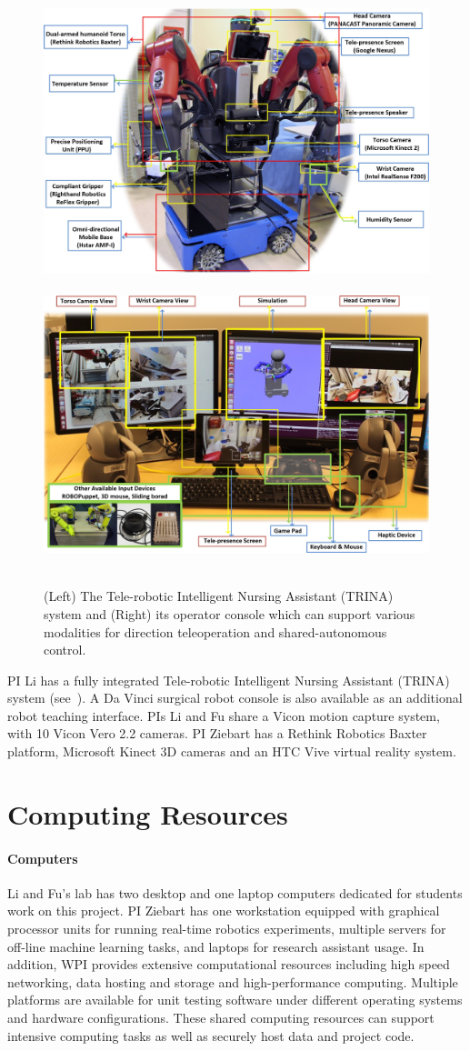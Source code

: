 \begin{figure}[h!]
\mbox{
  \includegraphics[width=0.48\linewidth]{fig//TRINA_Hardware_Notes}
    \includegraphics[width=0.48\linewidth]{fig//TRINA_Console_Notes}
}
    \caption{(Left) The Tele-robotic Intelligent Nursing Assistant (TRINA) system and (Right) its operator console which can support various modalities for direction teleoperation and shared-autonomous control.}
    \label{fig:Trina_facility}
\vspace{2ex}
\end{figure}

PI Li has a fully integrated Tele-robotic Intelligent Nursing Assistant (TRINA) system (see~). A Da Vinci surgical robot console is also available as an additional robot teaching interface. PIs Li and Fu share a Vicon motion capture system, with 10 Vicon Vero 2.2 cameras. PI Ziebart has a Rethink Robotics Baxter platform, Microsoft Kinect 3D cameras and an HTC Vive virtual reality system.

\section{Computing Resources}\label{sec:Computers}

\paragraph*{Computers} Li and Fu's lab has two desktop and one laptop computers dedicated for students work on this project. PI Ziebart has one workstation equipped with graphical processor units for running real-time robotics experiments, multiple servers for off-line machine learning tasks, and laptops for research assistant usage. In addition, WPI provides extensive computational resources including high speed networking, data hosting and storage and high-performance computing. Multiple platforms are available for unit testing software under different operating systems and hardware configurations. These shared computing resources can support intensive computing tasks as well as securely host data and project code. 

